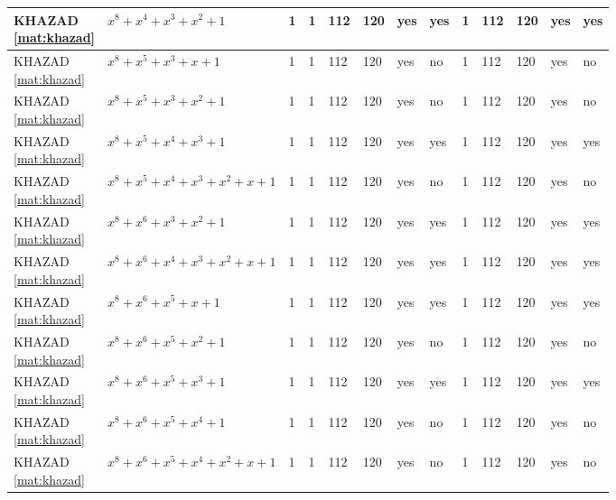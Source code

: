 \begin{tiny}
\begin{longtable}{|l|l|l|l|l|l|l|l|l|l|l|l|l|}
\shortstack{KHAZAD \\ \eqref{mat:khazad}} & $x^8 + x^4 + x^3 + x^2 + 1$ & 1 & 1 & 112 & 120 & yes & yes & 1 & 112 & 120 & yes & yes \\ \hline
\shortstack{KHAZAD \\ \eqref{mat:khazad}} & $x^8 + x^5 + x^3 + x + 1$ & 1 & 1 & 112 & 120 & yes & no & 1 & 112 & 120 & yes & no \\ \hline
\shortstack{KHAZAD \\ \eqref{mat:khazad}} & $x^8 + x^5 + x^3 + x^2 + 1$ & 1 & 1 & 112 & 120 & yes & no & 1 & 112 & 120 & yes & no \\ \hline
\shortstack{KHAZAD \\ \eqref{mat:khazad}} & $x^8 + x^5 + x^4 + x^3 + 1$ & 1 & 1 & 112 & 120 & yes & yes & 1 & 112 & 120 & yes & yes \\ \hline
\shortstack{KHAZAD \\ \eqref{mat:khazad}} & $x^8 + x^5 + x^4 + x^3 + x^2 + x + 1$ & 1 & 1 & 112 & 120 & yes & no & 1 & 112 & 120 & yes & no \\ \hline
\shortstack{KHAZAD \\ \eqref{mat:khazad}} & $x^8 + x^6 + x^3 + x^2 + 1$ & 1 & 1 & 112 & 120 & yes & yes & 1 & 112 & 120 & yes & yes \\ \hline
\shortstack{KHAZAD \\ \eqref{mat:khazad}} & $x^8 + x^6 + x^4 + x^3 + x^2 + x + 1$ & 1 & 1 & 112 & 120 & yes & yes & 1 & 112 & 120 & yes & yes \\ \hline
\shortstack{KHAZAD \\ \eqref{mat:khazad}} & $x^8 + x^6 + x^5 + x + 1$ & 1 & 1 & 112 & 120 & yes & yes & 1 & 112 & 120 & yes & yes \\ \hline
\shortstack{KHAZAD \\ \eqref{mat:khazad}} & $x^8 + x^6 + x^5 + x^2 + 1$ & 1 & 1 & 112 & 120 & yes & no & 1 & 112 & 120 & yes & no \\ \hline
\shortstack{KHAZAD \\ \eqref{mat:khazad}} & $x^8 + x^6 + x^5 + x^3 + 1$ & 1 & 1 & 112 & 120 & yes & yes & 1 & 112 & 120 & yes & yes \\ \hline
\shortstack{KHAZAD \\ \eqref{mat:khazad}} & $x^8 + x^6 + x^5 + x^4 + 1$ & 1 & 1 & 112 & 120 & yes & no & 1 & 112 & 120 & yes & no \\ \hline
\shortstack{KHAZAD \\ \eqref{mat:khazad}} & $x^8 + x^6 + x^5 + x^4 + x^2 + x + 1$ & 1 & 1 & 112 & 120 & yes & no & 1 & 112 & 120 & yes & no \\ \hline

\end{longtable}
\end{tiny}
